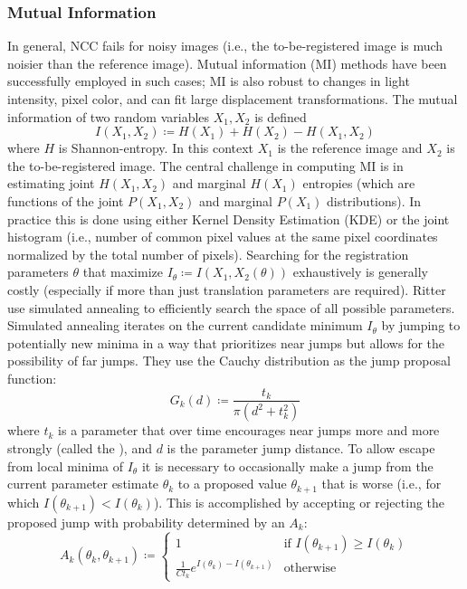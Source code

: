 \subsubsection{Mutual Information}

In general, NCC fails for noisy images (i.e., the to-be-registered image is much noisier than the reference image).
%
Mutual information (MI) methods have been successfully employed in such cases; MI is also robust to changes in light intensity, pixel color, and can fit large displacement transformations.
%
The mutual information of two random variables \(X_1, X_2\) is defined
\[
	I (X_1,X_2) \coloneqq H (X_1)+H (X_2)-H (X_1,X_2)
\]
where \(H\) is Shannon-entropy.
%
In this context \(X_1\) is the reference image and \(X_2\) is the to-be-registered image.
%
The central challenge in computing MI is in estimating joint \(H(X_1,X_2)\) and marginal \(H(X_1)\) entropies (which are functions of the joint \(P(X_1,X_2)\) and marginal \(P(X_1)\) distributions).
%
In practice this is done using either Kernel Density Estimation (KDE) or the joint histogram (i.e., number of common pixel values at the same pixel coordinates normalized by the total number of pixels).
%
Searching for the registration parameters \(\theta\) that maximize \(I_{\theta} \coloneqq I(X_1,X_2(\theta))\) exhaustively is generally costly (especially if more than just translation parameters are required).
%
Ritter \etal \cite{ritter1999} use simulated annealing to efficiently search the space of all possible parameters.
%
Simulated annealing iterates on the current candidate minimum \(I_{\theta}\) by jumping to potentially new minima in a way that prioritizes near jumps but allows for the possibility of far jumps.
%
They use the Cauchy distribution as the jump proposal function:
\[
	G_k(d) \coloneqq \frac{t_k}{\pi \left( d^2 + t_k^2 \right)}
\]
where \(t_k\) is a parameter that over time encourages near jumps more and more strongly (called the ), and \(d\) is the parameter jump distance.
%
To allow escape from local minima of \(I_{\theta}\) it is necessary to occasionally make a jump from the current parameter estimate \(\theta_k\) to a proposed value \(\theta_{k+1}\) that is worse (i.e., for which \(I(\theta_{k+1}) < I(\theta_{k}) \)).
%
This is accomplished by accepting or rejecting the proposed jump with probability determined by an  \(A_k\):
\[
	A_k(\theta_{k}, \theta_{k+1}) \coloneqq \begin{cases}
		1                                                  & \text{if } I(\theta_{k+1}) \geq I(\theta_{k}) \\
		\frac{1}{C t_k}e^{I(\theta_{k}) - I(\theta_{k+1})} & \text{otherwise}
	\end{cases}
\]

